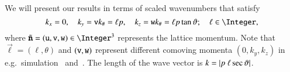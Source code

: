     We will present our results in terms of scaled wavenumbers that satisfy %
    \begin{equation}
        k_x= 0, \quad k_y= \lcoord{v}k_\#=\ell p, \quad k_z = \lcoord{w}k_\#= \ell p \tan{\vartheta}; \quad \ell\in \Integer,
    \end{equation}
    where $\lcoordk = (\lcoord{u},\lcoord{v},\lcoord{w})\in\Integer^3$ represents the lattice momentum. Note that $\vec{\ell}=(\ell, \theta)$ and $(\mathtt{v}, \mathtt{w})$ represent different comoving momenta $(0,k_y,k_z)$ in e.g.~simulation~ and~. The length of the wave vector is $k = \abs{p \ell \sec{\vartheta}}$.
    

